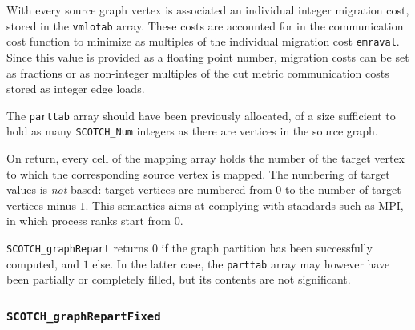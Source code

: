 \begin{itemize}
With every source graph vertex is associated an individual integer
migration cost, stored in the {\tt vmlotab} array. These costs are
accounted for in the communication cost function to minimize as
multiples of the individual migration cost {\tt emraval}. Since this
value is provided as a floating point number, migration costs can be
set as fractions or as non-integer multiples of the cut metric
communication costs stored as integer edge loads.

The {\tt parttab} array should have been previously allocated, of a
size sufficient to hold as many {\tt SCOTCH\_\lbt Num} integers as
there are vertices in the source graph.

On return, every cell of the mapping array holds the number of the
target vertex to which the corresponding source vertex is mapped.
The numbering of target values is {\em not\/} based: target vertices
are numbered from $0$ to the number of target vertices minus $1$.
This semantics aims at complying with standards such as MPI, in
which process ranks start from $0$.

\progret

{\tt SCOTCH\_graphRepart} returns $0$ if the graph partition has
been successfully computed, and $1$ else. In the latter case, the
{\tt parttab} array may however have been partially or completely
filled, but its contents are not significant.
\end{itemize}

\subsubsection{{\tt SCOTCH\_graphRepartFixed}}
\label{sec-lib-func-graphrepartfixed}

